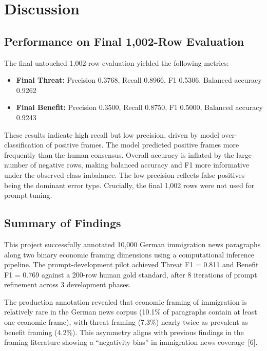 \FloatBarrier
\section{Discussion}
\label{sec:discussion}

\subsection{Performance on Final 1,002-Row Evaluation}
The final untouched 1,002-row evaluation yielded the following metrics:
\begin{itemize}
    \item \textbf{Final Threat:} Precision 0.3768, Recall 0.8966, F1 0.5306, Balanced accuracy 0.9262
    \item \textbf{Final Benefit:} Precision 0.3500, Recall 0.8750, F1 0.5000, Balanced accuracy 0.9243
\end{itemize}
These results indicate high recall but low precision, driven by model over-classification of positive frames. The model predicted positive frames more frequently than the human consensus. Overall accuracy is inflated by the large number of negative rows, making balanced accuracy and F1 more informative under the observed class imbalance. The low precision reflects false positives being the dominant error type. Crucially, the final 1,002 rows were not used for prompt tuning.
\subsection{Summary of Findings}

This project successfully annotated 10,000 German immigration news paragraphs along two binary economic framing dimensions using a computational inference pipeline. The prompt-development pilot achieved Threat F1 = 0.811 and Benefit F1 = 0.769 against a 200-row human gold standard, after 8 iterations of prompt refinement across 3 development phases.

The production annotation revealed that economic framing of immigration is relatively rare in the German news corpus (10.1\% of paragraphs contain at least one economic frame), with threat framing (7.3\%) nearly twice as prevalent as benefit framing (4.2\%). This asymmetry aligns with previous findings in the framing literature showing a ``negativity bias'' in immigration news coverage~[6].

